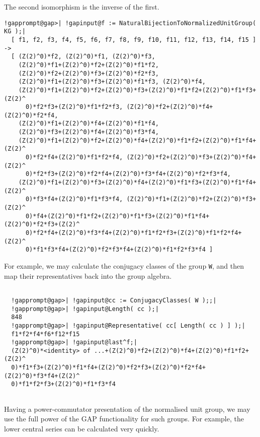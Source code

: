 \documentclass[a4paper,11pt]{report}
\begin{document}
{\begin{Verbatim}[commandchars=!@|,fontsize=\small,frame=single,label=Example]
\end{Verbatim}
 \newpage The second isomorphism is the inverse of the first. 
\begin{Verbatim}[commandchars=!@|,fontsize=\small,frame=single,label=Example]
  !gapprompt@gap>| !gapinput@f := NaturalBijectionToNormalizedUnitGroup( KG );|
  [ f1, f2, f3, f4, f5, f6, f7, f8, f9, f10, f11, f12, f13, f14, f15 ] ->
  [ (Z(2)^0)*f2, (Z(2)^0)*f1, (Z(2)^0)*f3,
    (Z(2)^0)*f1+(Z(2)^0)*f2+(Z(2)^0)*f1*f2,
    (Z(2)^0)*f2+(Z(2)^0)*f3+(Z(2)^0)*f2*f3,
    (Z(2)^0)*f1+(Z(2)^0)*f3+(Z(2)^0)*f1*f3, (Z(2)^0)*f4,
    (Z(2)^0)*f1+(Z(2)^0)*f2+(Z(2)^0)*f3+(Z(2)^0)*f1*f2+(Z(2)^0)*f1*f3+(Z(2)^
      0)*f2*f3+(Z(2)^0)*f1*f2*f3, (Z(2)^0)*f2+(Z(2)^0)*f4+(Z(2)^0)*f2*f4,
    (Z(2)^0)*f1+(Z(2)^0)*f4+(Z(2)^0)*f1*f4,
    (Z(2)^0)*f3+(Z(2)^0)*f4+(Z(2)^0)*f3*f4,
    (Z(2)^0)*f1+(Z(2)^0)*f2+(Z(2)^0)*f4+(Z(2)^0)*f1*f2+(Z(2)^0)*f1*f4+(Z(2)^
      0)*f2*f4+(Z(2)^0)*f1*f2*f4, (Z(2)^0)*f2+(Z(2)^0)*f3+(Z(2)^0)*f4+(Z(2)^
      0)*f2*f3+(Z(2)^0)*f2*f4+(Z(2)^0)*f3*f4+(Z(2)^0)*f2*f3*f4,
    (Z(2)^0)*f1+(Z(2)^0)*f3+(Z(2)^0)*f4+(Z(2)^0)*f1*f3+(Z(2)^0)*f1*f4+(Z(2)^
      0)*f3*f4+(Z(2)^0)*f1*f3*f4, (Z(2)^0)*f1+(Z(2)^0)*f2+(Z(2)^0)*f3+(Z(2)^
      0)*f4+(Z(2)^0)*f1*f2+(Z(2)^0)*f1*f3+(Z(2)^0)*f1*f4+(Z(2)^0)*f2*f3+(Z(2)^
      0)*f2*f4+(Z(2)^0)*f3*f4+(Z(2)^0)*f1*f2*f3+(Z(2)^0)*f1*f2*f4+(Z(2)^
      0)*f1*f3*f4+(Z(2)^0)*f2*f3*f4+(Z(2)^0)*f1*f2*f3*f4 ]
\end{Verbatim}
 For example, we may calculate the conjugacy classes of the group \texttt{W}, and then map their representatives back into the group algebra. 
\begin{Verbatim}[commandchars=!@|,fontsize=\small,frame=single,label=Example]
  
  !gapprompt@gap>| !gapinput@cc := ConjugacyClasses( W );;|
  !gapprompt@gap>| !gapinput@Length( cc );|
  848
  !gapprompt@gap>| !gapinput@Representative( cc[ Length( cc ) ] );|
  f1*f2*f4*f6*f12*f15
  !gapprompt@gap>| !gapinput@last^f;|
  (Z(2)^0)*<identity> of ...+(Z(2)^0)*f2+(Z(2)^0)*f4+(Z(2)^0)*f1*f2+(Z(2)^
  0)*f1*f3+(Z(2)^0)*f1*f4+(Z(2)^0)*f2*f3+(Z(2)^0)*f2*f4+(Z(2)^0)*f3*f4+(Z(2)^
  0)*f1*f2*f3+(Z(2)^0)*f1*f3*f4
  
\end{Verbatim}
 Having a power-commutator presentation of the normalised unit group, we may
use the full power of the \textsf{GAP} functionality for such groups. For example, the lower central series can be
calculated very quickly. 
\begin{Verbatim}[commandchars=!@|,fontsize=\small,frame=single,label=Example]
  

\end{Verbatim}}
\end{document}
